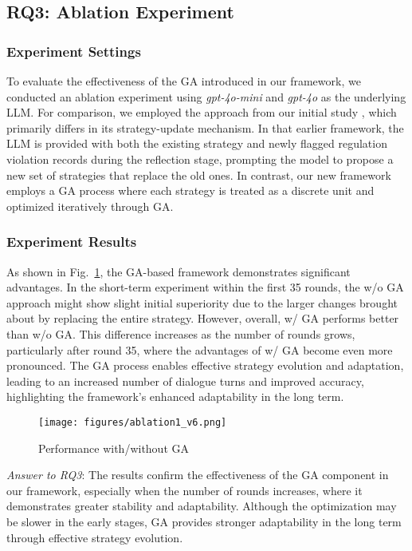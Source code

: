 \subsection{RQ3: Ablation Experiment}
\subsubsection{Experiment Settings}

To evaluate the effectiveness of the GA introduced in our framework, we conducted an ablation experiment using \textit{gpt-4o-mini} and \textit{gpt-4o} as the underlying LLM. For comparison, we employed the approach from our initial study \cite{DBLP:conf/cec/CaiLZLWT24}, which primarily differs in its strategy-update mechanism. In that earlier framework, the LLM is provided with both the existing strategy and newly flagged regulation violation records during the reflection stage, prompting the model to propose a new set of strategies that replace the old ones.
In contrast, our new framework employs a GA process where each strategy is treated as a discrete unit and optimized iteratively through GA. 

\subsubsection{Experiment Results}
As shown in Fig.~\ref{fig:ablation}, the GA-based framework demonstrates significant advantages. In the short-term experiment within the first 35 rounds, the w/o GA approach might show slight initial superiority due to the larger changes brought about by replacing the entire strategy. However, overall, w/ GA performs better than w/o GA. This difference increases as the number of rounds grows, particularly after round 35, where the advantages of w/ GA become even more pronounced. The GA process enables effective strategy evolution and adaptation, leading to an increased number of dialogue turns and improved accuracy, highlighting the framework's enhanced adaptability in the long term.
\begin{figure}[h!]
    \centering
    \texttt{[image: figures/ablation1\_v6.png]}
    \caption{Performance with/without GA}
    \label{fig:ablation}
\end{figure}
\setlength{\fboxrule}{0.5pt} 
\vspace{0.5em}
\noindent
\begin{tcolorbox}[colframe=black!20, colback=gray!10, arc=5pt, boxrule=0.5pt, width=0.99\linewidth]
\textit{Answer to RQ3}: The results confirm the effectiveness of the GA component in our framework, especially when the number of rounds increases, where it demonstrates greater stability and adaptability. Although the optimization may be slower in the early stages, GA provides stronger adaptability in the long term through effective strategy evolution.
\end{tcolorbox}

